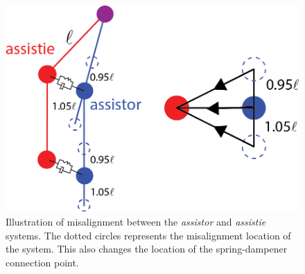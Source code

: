 \begin{figure}
    \centering
    \includegraphics{images/controllers/alignment_comparison.png}
    \caption[Illustration of the pendulum misalignment of ]{Illustration of misalignment between the  \textit{assistor} and  \textit{assistie} systems. The dotted circles represents the misalignment location of the system. This also changes the location of the spring-dampener connection point.  }
    \label{fig:misalignmentIllistration}
\end{figure}


